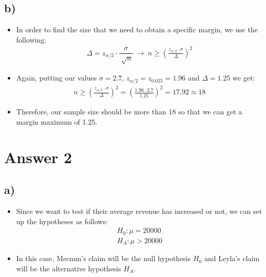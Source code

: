 \documentclass[12pt]{article}
\begin{document}
\subsection*{b)} 
\begin{itemize}
    \item In order to find the size that we need to obtain a specific margin, we use the following:
    \begin{equation*}
        \begin{split}
            \Delta = z_{\alpha/2} \cdot \dfrac{\sigma}{\sqrt[]{n}} \ \rightarrow \ n \geq { \left(\frac{z_{\alpha/2} \cdot \sigma}{\Delta}\right) }^2
        \end{split}
    \end{equation*}
    \item Again, putting our values $\sigma = 2.7$, $z_{\alpha/2} = z_{0.025} = 1.96$ and $\Delta = 1.25$ we get:
    \begin{equation*}
        \begin{split}
            n \geq { \left(\frac{z_{\alpha/2} \cdot \sigma}{\Delta}\right) }^2 = { \left(\frac{1.96 \cdot 2.7}{1.25}\right) }^2 = 17.92 \approx 18
        \end{split}
    \end{equation*}
    \item Therefore, our sample size should be more than 18 so that we can get a margin maximum of 1.25.
\end{itemize}



\section*{Answer 2}

\subsection*{a)} 
\begin{itemize}
    \item Since we want to test if their average revenue has increased or not, we can set up the hypotheses as follows:
    \begin{equation*}
        \begin{split}
            H_0: \mu = 20000 \\
            H_A: \mu > 20000
        \end{split}
    \end{equation*}
    \item In this case, Mecnun's claim will be the null hypothesis $H_0$ and Leyla's claim will be the alternative hypothesis $H_A$.
\end{itemize}
\end{document}
